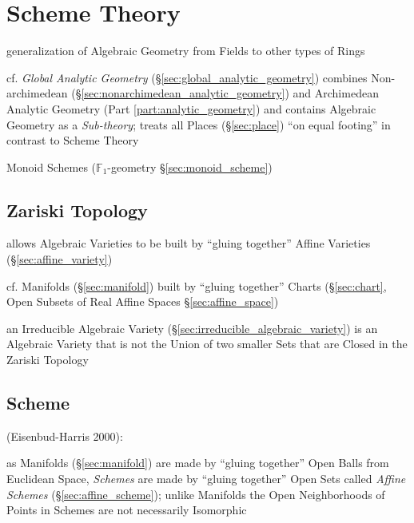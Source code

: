 \section{Scheme Theory}\label{sec:scheme_theory}

generalization of Algebraic Geometry from Fields to other types of Rings

\fist cf. \emph{Global Analytic Geometry} (\S\ref{sec:global_analytic_geometry})
combines Non-archimedean (\S\ref{sec:nonarchimedean_analytic_geometry}) and
Archimedean Analytic Geometry (Part \ref{part:analytic_geometry}) and contains
Algebraic Geometry as a \emph{Sub-theory}; treats all Places
(\S\ref{sec:place}) ``on equal footing'' in contrast to Scheme Theory

\fist Monoid Schemes ($\mathbb{F}_1$-geometry \S\ref{sec:monoid_scheme})



\subsection{Zariski Topology}\label{sec:zariski_topology}

allows Algebraic Varieties to be built by ``gluing together'' Affine Varieties
 (\S\ref{sec:affine_variety})

cf. Manifolds (\S\ref{sec:manifold}) built by ``gluing together'' Charts
(\S\ref{sec:chart}, Open Subsets of Real Affine Spaces
\S\ref{sec:affine_space})

an Irreducible Algebraic Variety (\S\ref{sec:irreducible_algebraic_variety}) is
an Algebraic Variety that is not the Union of two smaller Sets that are Closed
in the Zariski Topology



\subsection{Scheme}\label{sec:scheme}

(Eisenbud-Harris 2000):

as Manifolds (\S\ref{sec:manifold}) are made by ``gluing together'' Open Balls
from Euclidean Space, \emph{Schemes} are made by ``gluing together'' Open Sets
called \emph{Affine Schemes} (\S\ref{sec:affine_scheme}); unlike Manifolds the
Open Neighborhoods of Points in Schemes are not necessarily Isomorphic

